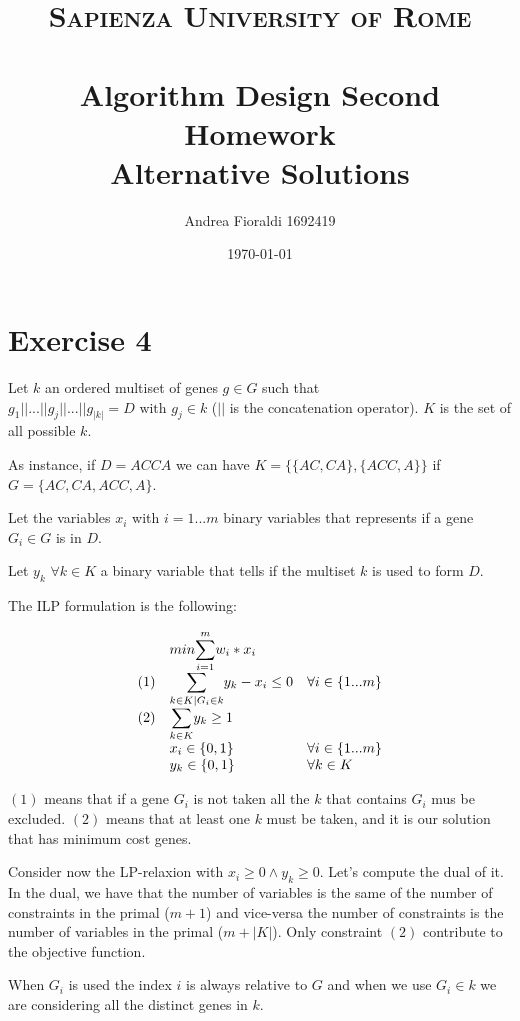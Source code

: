 \documentclass[paper=a4, fontsize=11pt]{scrartcl} %
\title{
\normalfont \normalsize 
\textsc{Sapienza University of Rome} \\ [25pt] %
\vspace*{60px}
\horrule{0.5pt} \\[0.4cm] %
Algorithm Design Second Homework \\
\null
\huge Alternative Solutions %
\horrule{2pt} \\[0.5cm] %
}
\author{Andrea Fioraldi 1692419} %
\date{\normalsize\today} %
\numberwithin{equation}{section} %
\numberwithin{figure}{section} %
\numberwithin{table}{section} %
\begin{document}
\maketitle %

\newpage
\section{Exercise 4}

Let $k$ an ordered multiset of genes $g \in G$ such that $g_1 || ... || g_j || ... || g_{|k|} = D \text{ with } g_j \in k$ ($||$ is the concatenation operator). $K$ is the set of all possible $k$.

As instance, if $D = ACCA$ we can have $K = \{\{AC,CA\},\{ACC,A\}\}$ if $G = \{AC,CA,ACC,A\}$.

Let the variables $x_i$ with $i = 1 ... m$ binary variables that represents if a gene $G_i \in G$ is in $D$. 

Let $y_k$ $\forall k \in K$ a binary variable that tells if the multiset $k$ is used to form $D$.

The ILP formulation is the following:

\[
    \begin{array}{lll}
    & min \mathlarger{\sum}_{i = 1}^m w_i*x_i & \\
    (1) & \mathlarger{\sum}_{k \in K | G_i \in k} y_k - x_i \leq 0 & \forall i \in \{1 ... m\} \\
    (2) & \mathlarger{\sum}_{k \in K} y_k \geq 1 & \\
    & x_i \in \{0, 1\} & \forall i \in \{1 ... m\} \\
    & y_k \in \{0, 1\} & \forall k \in K
    \end{array}
\]

$(1)$ means that if a gene $G_i$ is not taken all the $k$ that contains $G_i$ mus be excluded. $(2)$ means that at least one $k$ must be taken, and it is our solution that has minimum cost genes.

Consider now the LP-relaxion with $x_i \geq 0 \land y_k \geq 0$. Let's compute the dual of it.
In the dual, we have that the number of variables is the same of the number of constraints in the primal ($m+1$) and vice-versa the number of constraints is the number of variables in the primal ($m+|K|$).
Only constraint $(2)$ contribute to the objective function.

When $G_i$ is used the index $i$ is always relative to $G$ and when we use $G_i \in k$ we are considering all the distinct genes in $k$.
\end{document}
